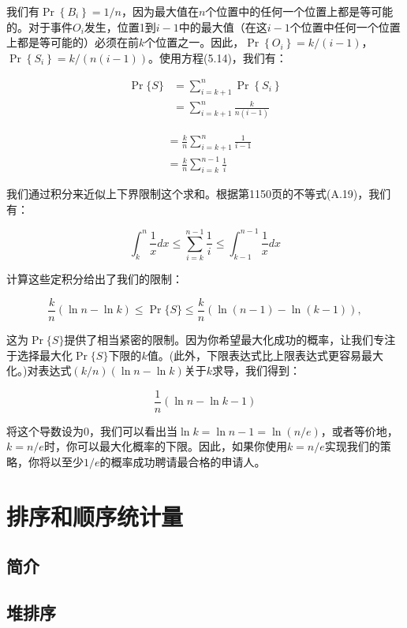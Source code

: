 \documentclass[lang=cn,newtx,10pt,scheme=chinese]{elegantbook}
\begin{document}
我们有$\operatorname{Pr}\left\{B_i\right\}=1 / n$，因为最大值在$n$个位置中的任何一个位置上都是等可能的。对于事件$O_i$发生，位置1到$i-1$中的最大值（在这$i-1$个位置中任何一个位置上都是等可能的）必须在前$k$个位置之一。因此，$\operatorname{Pr}\left\{O_i\right\}=k /(i-1)$，$\operatorname{Pr}\left\{S_i\right\}=k /(n(i-1))$。使用方程(5.14)，我们有：

$$
\begin{aligned}
\operatorname{Pr}\{S\} & =\sum_{i=k+1}^n \operatorname{Pr}\left\{S_i\right\} \\
& =\sum_{i=k+1}^n \frac{k}{n(i-1)}
\end{aligned}
$$

$$
\begin{aligned}
& =\frac{k}{n} \sum_{i=k+1}^n \frac{1}{i-1} \\
& =\frac{k}{n} \sum_{i=k}^{n-1} \frac{1}{i}
\end{aligned}
$$

我们通过积分来近似上下界限制这个求和。根据第1150页的不等式(A.19)，我们有：

$$
\int_k^n \frac{1}{x} d x \leq \sum_{i=k}^{n-1} \frac{1}{i} \leq \int_{k-1}^{n-1} \frac{1}{x} d x
$$

计算这些定积分给出了我们的限制：

$$
\frac{k}{n}(\ln n-\ln k) \leq \operatorname{Pr}\{S\} \leq \frac{k}{n}(\ln (n-1)-\ln (k-1)),
$$

这为$\operatorname{Pr}\{S\}$提供了相当紧密的限制。因为你希望最大化成功的概率，让我们专注于选择最大化$\operatorname{Pr}\{S\}$下限的$k$值。(此外，下限表达式比上限表达式更容易最大化。)对表达式$(k / n)(\ln n-\ln k)$关于$k$求导，我们得到：

$$
\frac{1}{n}(\ln n-\ln k-1)
$$

将这个导数设为0，我们可以看出当$\ln k=\ln n-1=\ln (n / e)$，或者等价地，$k=n / e$时，你可以最大化概率的下限。因此，如果你使用$k=n / e$实现我们的策略，你将以至少$1 / e$的概率成功聘请最合格的申请人。

\part{排序和顺序统计量}

\chapter*{简介}

\chapter{堆排序}
\end{document}
